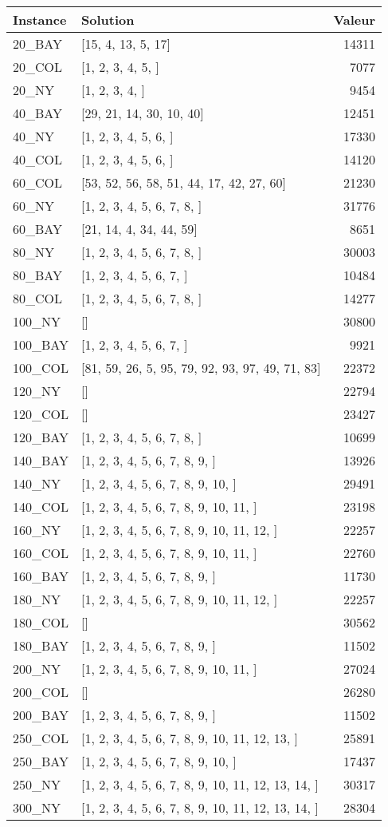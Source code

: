 \documentclass[main.tex]{subfiles}
\begin{document}
\begin{center}
\renewcommand{\arraystretch}{1.4} 
\begin{tabular}{llr}\hline
\textbf{Instance} & \textbf{Solution} & \textbf{Valeur} \\\hline

20\_BAY & [15, 4, 13, 5, 17] & 14311\\
20\_COL & [1, 2, 3, 4, 5, ] & 7077\\
20\_NY & [1, 2, 3, 4, ] & 9454\\
40\_BAY & [29, 21, 14, 30, 10, 40] & 12451\\
40\_NY & [1, 2, 3, 4, 5, 6, ] & 17330\\
40\_COL & [1, 2, 3, 4, 5, 6, ] & 14120\\
60\_COL & [53, 52, 56, 58, 51, 44, 17, 42, 27, 60] & 21230\\
60\_NY & [1, 2, 3, 4, 5, 6, 7, 8, ] & 31776\\
60\_BAY & [21, 14, 4, 34, 44, 59] & 8651\\
80\_NY & [1, 2, 3, 4, 5, 6, 7, 8, ] & 30003\\
80\_BAY & [1, 2, 3, 4, 5, 6, 7, ] & 10484\\
80\_COL & [1, 2, 3, 4, 5, 6, 7, 8, ] & 14277\\
100\_NY & [] & 30800\\
100\_BAY & [1, 2, 3, 4, 5, 6, 7, ] & 9921\\
100\_COL & [81, 59, 26, 5, 95, 79, 92, 93, 97, 49, 71, 83] & 22372\\
120\_NY & [] & 22794\\
120\_COL & [] & 23427\\
120\_BAY & [1, 2, 3, 4, 5, 6, 7, 8, ] & 10699\\
140\_BAY & [1, 2, 3, 4, 5, 6, 7, 8, 9, ] & 13926\\
140\_NY & [1, 2, 3, 4, 5, 6, 7, 8, 9, 10, ] & 29491\\
140\_COL & [1, 2, 3, 4, 5, 6, 7, 8, 9, 10, 11, ] & 23198\\
160\_NY & [1, 2, 3, 4, 5, 6, 7, 8, 9, 10, 11, 12, ] & 22257\\
160\_COL & [1, 2, 3, 4, 5, 6, 7, 8, 9, 10, 11, ] & 22760\\
160\_BAY & [1, 2, 3, 4, 5, 6, 7, 8, 9, ] & 11730\\
180\_NY & [1, 2, 3, 4, 5, 6, 7, 8, 9, 10, 11, 12, ] & 22257\\
180\_COL & [] & 30562\\
180\_BAY & [1, 2, 3, 4, 5, 6, 7, 8, 9, ] & 11502\\
200\_NY & [1, 2, 3, 4, 5, 6, 7, 8, 9, 10, 11, ] & 27024\\
200\_COL & [] & 26280\\
200\_BAY & [1, 2, 3, 4, 5, 6, 7, 8, 9, ] & 11502\\
250\_COL & [1, 2, 3, 4, 5, 6, 7, 8, 9, 10, 11, 12, 13, ] & 25891\\
250\_BAY & [1, 2, 3, 4, 5, 6, 7, 8, 9, 10, ] & 17437\\
250\_NY & [1, 2, 3, 4, 5, 6, 7, 8, 9, 10, 11, 12, 13, 14, ] & 30317\\
300\_NY & [1, 2, 3, 4, 5, 6, 7, 8, 9, 10, 11, 12, 13, 14, ] & 28304\\
\hline\end{tabular}
\end{center}
\end{document}
